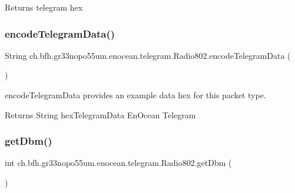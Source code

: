 \begin{DoxyReturn}{Returns}
telegram hex 
\end{DoxyReturn}
\hypertarget{classch_1_1bfh_1_1gr33nopo55um_1_1enocean_1_1telegram_1_1_radio802_a47f39507aeaad32488ce6f4e623757b6}{}\label{classch_1_1bfh_1_1gr33nopo55um_1_1enocean_1_1telegram_1_1_radio802_a47f39507aeaad32488ce6f4e623757b6} 
\subsubsection{\texorpdfstring{encode\+Telegram\+Data()}{encodeTelegramData()}}
{\footnotesize\ttfamily String ch.\+bfh.\+gr33nopo55um.\+enocean.\+telegram.\+Radio802.\+encode\+Telegram\+Data (\begin{DoxyParamCaption}{ }\end{DoxyParamCaption})}

encode\+Telegram\+Data provides an example data hex for this packet type.

\begin{DoxyReturn}{Returns}
String hex\+Telegram\+Data En\+Ocean Telegram 
\end{DoxyReturn}
\hypertarget{classch_1_1bfh_1_1gr33nopo55um_1_1enocean_1_1telegram_1_1_radio802_a0e89a7ac96074f5a878ad5eb63a8b824}{}\label{classch_1_1bfh_1_1gr33nopo55um_1_1enocean_1_1telegram_1_1_radio802_a0e89a7ac96074f5a878ad5eb63a8b824} 
\subsubsection{\texorpdfstring{get\+Dbm()}{getDbm()}}
{\footnotesize\ttfamily int ch.\+bfh.\+gr33nopo55um.\+enocean.\+telegram.\+Radio802.\+get\+Dbm (\begin{DoxyParamCaption}{ }\end{DoxyParamCaption})}

\hypertarget{classch_1_1bfh_1_1gr33nopo55um_1_1enocean_1_1telegram_1_1_radio802_a30391d582884efd4d5ab68b18b1f9c8d}{}\label{classch_1_1bfh_1_1gr33nopo55um_1_1enocean_1_1telegram_1_1_radio802_a30391d582884efd4d5ab68b18b1f9c8d} 
